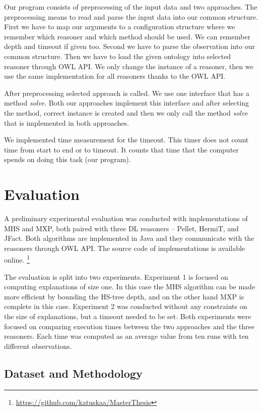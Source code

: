 \documentclass[12pt,a4paper]{article}
\begin{document}
Our program consists of preprocessing of the input data and two approaches. The preprocessing means to read and parse the input data into our common structure. First we have to map our arguments to a configuration structure where we remember which reasoner and which method should be used. We can remember depth and timeout if given too. Second we have to parse the observation into our common structure. Then we have to load the given ontology into selected reasoner through OWL API. We only change the instance of a reasoner, then we use the same implementation for all reasoners thanks to the OWL API.

After preprocessing selected approach is called. We use one interface that has a method \textit{solve}. Both our approaches implement this interface and after selecting the method, correct instance is created and then we only call the method \textit{solve} that is implemented in both approaches.

We implemented time measurement for the timeout. This timer does not count time from start to end or to timeout. It counts that time that the computer spends on doing this task (our program).

\pagebreak
\section{Evaluation}

A preliminary experimental evaluation was conducted with implementations of
MHS and MXP, both paired with three  DL reasoners -- Pellet, HermiT, and
JFact. Both algorithms are implemented in Java and they communicate with the
reasoners through OWL API. The source code of implementations is available online.
\footnote{\url{https://github.com/katuskaa/MasterThesis}}

The evaluation is split into two experiments. Experiment 1 is focused on
computing explanations of size one. In this case the MHS algorithm can be
made more efficient by bounding the HS-tree depth, and on the other hand
MXP is complete in this case. Experiment 2 was conducted without any
constraints on the size of explanations, but a timeout needed to be set. Both
experiments were focused on comparing execution times between the two
approaches and the three reasoners. Each time was computed as an average
value from ten runs with ten different observations.

\subsection{Dataset and Methodology}
\end{document}
